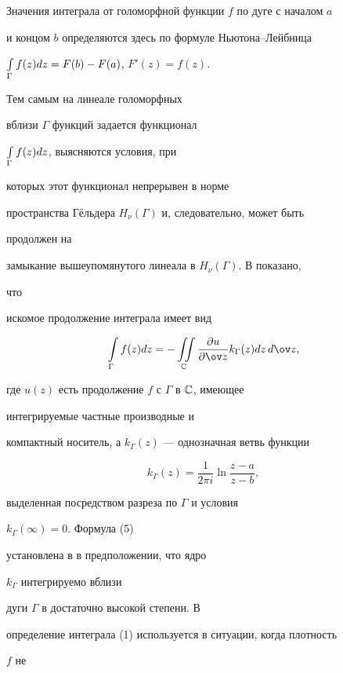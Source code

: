 Значения интеграла от голоморфной функции $f$ по дуге с началом $a$ 


и концом $b$ определяются здесь по формуле Ньютона--Лейбница 


$\int\limits_\Gamma f(z)dz=F(b)-F(a)$, $F'(z)=f(z)$. 


Тем самым на линеале голоморфных 


вблизи $\Gamma$ функций задается функционал 


$\int\limits_\Gamma f(z)dz$, выясняются условия, при 


которых этот функционал непрерывен в норме 


пространства Г\"ельдера $H_\nu(\Gamma)$ и, следовательно, может быть 


продолжен на 


замыкание вышеупомянутого линеала в $H_\nu(\Gamma)$. В \cite{8} показано, 


что 


искомое продолжение интеграла имеет вид 


\begin{equation} 


\intl_\Gamma f(z)dz=-\iint\limits_{\Bbb C} 


\myfrac{u}{\ov z}k_\Gamma (z)dz\,d\ov z, 


\end{equation} 


где $u(z)$ есть продолжение $f$ с $\Gamma$ в $\Bbb C$, имеющее 


интегрируемые частные производные и 


компактный носитель, а $k_\Gamma(z)$ --- однозначная ветвь функции 


\begin{equation} 


k_\Gamma (z)=\frac{1}{2\pi i}\ln\frac{z-a}{z-b}, 


\end{equation} 


выделенная посредством разреза по $\Gamma$ и условия 


$k_\Gamma(\infty)=0$. Формула (5) 


установлена в \cite{8} в предположении, что ядро 


$k_\Gamma$ интегрируемо вблизи 


дуги $\Gamma$ в достаточно высокой степени. В \cite{9} 


определение интеграла (1) используется в ситуации, когда плотность 


$f$ не 


